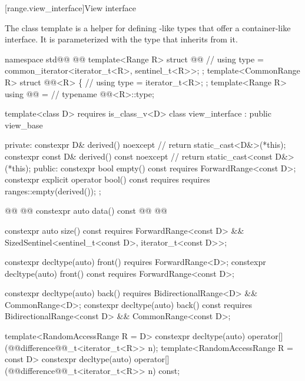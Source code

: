 {[range.view_interface]{View interface}

\pnum
The class template  is a helper for defining
-like types that offer a container-like interface. It is
parameterized with the type that inherits from it.

%
\begin{codeblock}
namespace std@@ { @@
  template<Range R>
  struct @@ { // \expos
    using type = common_iterator<iterator_t<R>, sentinel_t<R>>;
  };
  template<CommonRange R>
  struct @@<R> \{ // \expos
    using type = iterator_t<R>;
  };
  template<Range R>
    using @@ = // \expos
      typename @@<R>::type;

  template<class D>
    requires is_class_v<D>
  class view_interface : public view_base {
  private:
    constexpr D& derived() noexcept { // \expos
      return static_cast<D&>(*this);
    }
    constexpr const D& derived() const noexcept { // \expos
      return static_cast<const D&>(*this);
    }
  public:
    constexpr bool empty() const requires ForwardRange<const D>;
    constexpr explicit operator bool() const
      requires requires { ranges::empty(derived()); };

    @@
      @@
    constexpr auto data() const
      @@
      @@

    constexpr auto size() const requires ForwardRange<const D> &&
      SizedSentinel<sentinel_t<const D>, iterator_t<const D>>;

    constexpr decltype(auto) front() requires ForwardRange<D>;
    constexpr decltype(auto) front() const requires ForwardRange<const D>;

    constexpr decltype(auto) back()
      requires BidirectionalRange<D> && CommonRange<D>;
    constexpr decltype(auto) back() const
      requires BidirectionalRange<const D> && CommonRange<const D>;

    template<RandomAccessRange R = D>
      constexpr decltype(auto) operator[](@@difference@@_t<iterator_t<R>> n);
    template<RandomAccessRange R = const D>
      constexpr decltype(auto) operator[](@@difference@@_t<iterator_t<R>> n) const;

}
\end{codeblock}}
